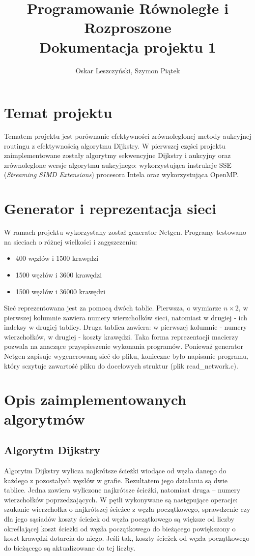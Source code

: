 \documentclass[12pt,a4paper]{article}
\title{Programowanie Równoległe i Rozproszone\\Dokumentacja projektu 1}
\author{Oskar Leszczyński, Szymon Piątek}
\begin{document}
\maketitle
\section{Temat projektu}
Tematem projektu jest porównanie efektywności zrównoleglonej metody aukcyjnej routingu z efektywnością algorytmu Dijkstry. W pierwszej części projektu zaimplementowane zostały algorytmy sekwencyjne Dijkstry i aukcyjny oraz zrównoleglone wersje algorytmu aukcyjnego: wykorzystująca instrukcje SSE (\textit{Streaming SIMD Extensions}) procesora Intela oraz wykorzystująca OpenMP.
\section{Generator i reprezentacja sieci}
W ramach projektu wykorzystany został generator Netgen. Programy testowano na sieciach o różnej wielkości i zagęszczeniu:
\begin{itemize}
\item 400 węzłów i 1500 krawędzi
\item 1500 węzłów i 3600 krawędzi
\item 1500 węzłów i 36000 krawędzi
\end{itemize}

Sieć reprezentowana jest za pomocą dwóch tablic. Pierwsza, o wymiarze $n \times 2$, w pierwszej kolumnie zawiera numery wierzchołków sieci, natomiast w drugiej - ich indeksy w drugiej tablicy. Druga tablica zawiera: w pierwszej kolumnie - numery wierzchołków, w drugiej - koszty krawędzi. Taka forma reprezentacji macierzy pozwala na znaczące przyspieszenie wykonania programów. Ponieważ generator Netgen zapisuje wygenerowaną sieć do pliku, konieczne było napisanie programu, który sczytuje zawartość pliku do docelowych struktur (plik read\_network.c).
\section{Opis zaimplementowanych algorytmów}
\subsection{Algorytm Dijkstry}
Algorytm Dijkstry wylicza najkrótsze ścieżki wiodące od węzła danego do każdego z pozostałych węzłów w grafie. Rezultatem jego działania są dwie tablice. Jedna zawiera wyliczone najkrótsze ścieżki, natomiast druga -- numery wierzchołków poprzedzających. W pętli wykonywane są następujące operacje: szukanie wierzchołka o najkrótszej ścieżce z węzła początkowego, sprawdzenie czy dla jego sąsiadów koszty ścieżek od węzła początkowego są większe od liczby określającej koszt ścieżki od węzła początkowego do bieżącego powiększony o koszt krawędzi dotarcia do niego. Jeśli tak, koszty ścieżek od węzła początkowego do bieżącego są aktualizowane do tej liczby.
\end{document}
